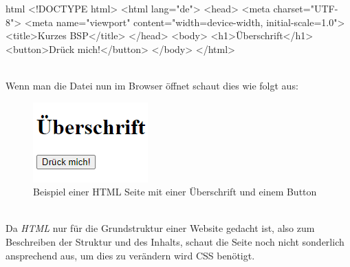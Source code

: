 		\begin{code}{html}
			<!DOCTYPE html>
			<html lang="de">
				<head>
					<meta charset="UTF-8">
					<meta name="viewport" content="width=device-width, initial-scale=1.0">
					<title>Kurzes BSP</title>
				</head>
				<body>
					<h1>Überschrift</h1>
					<button>Drück mich!</button>
				</body>
			</html>
		\end{code}
	\label{list:htmlbsp} ~\\
		Wenn man die Datei nun im Browser öffnet schaut dies wie folgt aus:
		\begin{figure}[H]
			\centering
			\includegraphics[width=0.3\linewidth]{images/html1}
			\caption[HTML Beispielseite]{Beispiel einer HTML Seite mit einer Überschrift und einem Button}
			\label{fig:htmlbsp}
		\end{figure}
		~\\
		Da \textit{HTML} nur für die Grundstruktur einer Website gedacht ist, also zum Beschreiben der Struktur und des Inhalts, schaut die Seite noch nicht sonderlich ansprechend aus, um dies zu verändern wird CSS benötigt.
		
